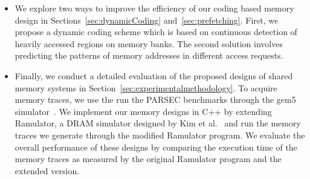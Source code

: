 \begin{itemize}
\item We explore two ways to improve the efficiency of our coding based memory design in Sections~\ref{sec:dynamicCoding} and~\ref{sec:prefetching}. First, we propose a dynamic coding scheme which is based on continuous detection of heavily accessed regions on memory banks. 
The second solution involves predicting the patterns of memory addresses in different access requests. 
\item {\color{blue}Finally, we conduct a detailed evaluation of the proposed designs of shared memory systems in Section~\ref{sec:experimentalmethodology}. To acquire memory traces, we use the run the PARSEC benchmarks\cite{bienia09parsec2} through the gem5 simulator~\cite{parsec_2_1_m5}. We implement our memory designs in C++ by extending Ramulator, a DRAM simulator designed by Kim et al.~\cite{Ramulator} and run the memory traces we generate through the modified Ramulator program. We evaluate the overall performance of these designs by comparing the execution time of the memory traces as measured by the original Ramulator program and the extended version.} %
\end{itemize}

